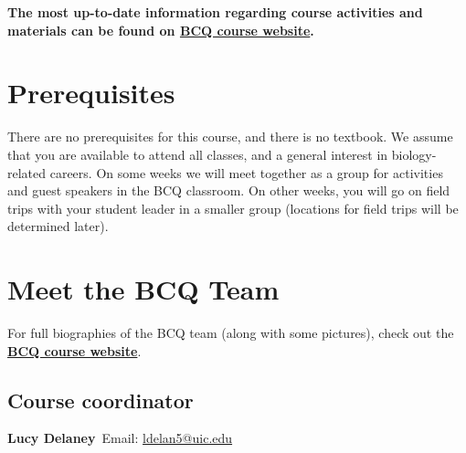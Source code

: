 \documentclass[12pt]{article}
\let\oldhref\href
\renewcommand{\href}[2]{\oldhref{#1}{\bfseries#2}}
\begin{document}
\textbf{The most up-to-date information regarding course activities and materials can be found on \href{https://ledelaney.org/teaching/2021/bcq}{BCQ course website}.}


\section{Prerequisites}

There are no prerequisites for this course, and there is no textbook. We assume that you are available to attend all classes, and a general interest in biology-related careers. On some weeks we will meet together as a group for activities and guest speakers in the BCQ classroom. On other weeks, you will go on field trips with your student leader in a smaller group (locations for field trips will be determined later).

\section{Meet the BCQ Team}

For full biographies of the BCQ team (along with some pictures), check out the \href{https://ledelaney.org/teaching/2021/bcq}{BCQ course website}.

\subsection{Course coordinator}
\textbf{Lucy Delaney}\ Email: \url{ldelan5@uic.edu}
\end{document}
